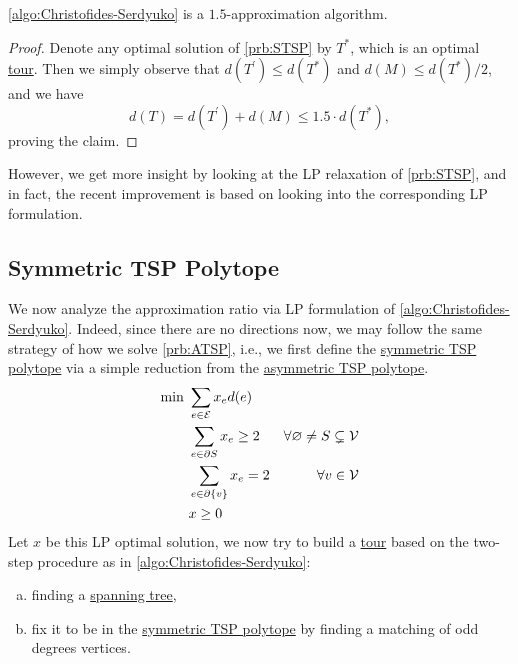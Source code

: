 \begin{theorem}\label{thm:lec12-2}
	\autoref{algo:Christofides-Serdyuko} is a \(1.5\)-approximation algorithm.
\end{theorem}
\begin{proof}
	Denote any optimal solution of \autoref{prb:STSP} by \(T^{\ast} \), which is an optimal \hyperref[def:tour]{tour}. Then we simply observe that \(d(T^\prime ) \leq d(T^{\ast} )\) and \(d(M) \leq d(T^{\ast} ) / 2\), and we have
	\[
		d(T) = d(T^\prime ) + d(M) \leq 1.5\cdot d(T^{\ast} ),
	\]
	proving the claim.
\end{proof}

However, we get more insight by looking at the LP relaxation of \autoref{prb:STSP}, and in fact, the recent improvement is based on looking into the corresponding LP formulation.

\subsection{Symmetric TSP Polytope}
We now analyze the approximation ratio via LP formulation of \autoref{algo:Christofides-Serdyuko}. Indeed, since there are no directions now, we may follow the same strategy of how we solve \autoref{prb:ATSP}, i.e., we first define the \hyperref[eq:STSP-polytope]{symmetric TSP polytope} via a simple reduction from the \hyperref[eq:ATSP-polytope]{asymmetric TSP polytope}.
\begin{equation}\label{eq:STSP-polytope}
	\begin{aligned}
		\min~ & \sum_{e\in \mathcal{\MakeUppercase{e}} } x_e d(e)                                                                     \\
		      & \sum_{e\in \partial S} x_e \geq 2                 & \forall \varnothing \neq S \subsetneq \mathcal{\MakeUppercase{v}} \\
		      & \sum_{e\in \partial \{v\}} x_e = 2                & \forall v\in \mathcal{\MakeUppercase{v}}                          \\
		      & x \geq 0
	\end{aligned}
\end{equation}
Let \(x\) be this LP optimal solution, we now try to build a \hyperref[def:tour]{tour} based on the two-step procedure as in \autoref{algo:Christofides-Serdyuko}:
\begin{enumerate}[(a)]
	\item finding a \hyperref[def:spanning-tree]{spanning tree},
	\item fix it to be in the \hyperref[eq:STSP-polytope]{symmetric TSP polytope} by finding a matching of odd degrees vertices.
\end{enumerate}

